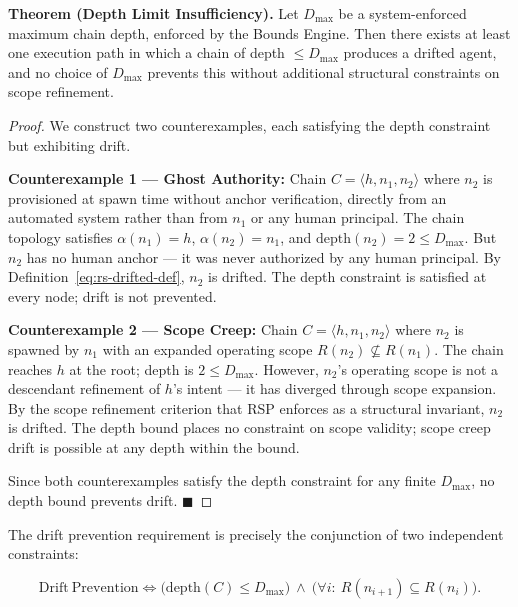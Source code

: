 \begin{samepage}
\medskip
\noindent\textbf{Theorem (Depth Limit Insufficiency).}
Let $D_{\max}$ be a system-enforced maximum chain depth, enforced by the Bounds Engine. Then there exists at least one execution path in which a chain of depth $\leq D_{\max}$ produces a drifted agent, and no choice of $D_{\max}$ prevents this without additional structural constraints on scope refinement.

\begin{proof}
We construct two counterexamples, each satisfying the depth constraint but exhibiting drift.

\medskip
\noindent\textbf{Counterexample 1 — Ghost Authority:} Chain $C = \langle h, n_1, n_2 \rangle$ where $n_2$ is provisioned at spawn time without anchor verification, directly from an automated system rather than from $n_1$ or any human principal. The chain topology satisfies $\alpha(n_1) = h$, $\alpha(n_2) = n_1$, and $\mathrm{depth}(n_2) = 2 \leq D_{\max}$. But $n_2$ has no human anchor — it was never authorized by any human principal. By Definition~\ref{eq:rs-drifted-def}, $n_2$ is drifted. The depth constraint is satisfied at every node; drift is not prevented.

\medskip
\noindent\textbf{Counterexample 2 — Scope Creep:} Chain $C = \langle h, n_1, n_2 \rangle$ where $n_2$ is spawned by $n_1$ with an expanded operating scope $R(n_2) \not\subseteq R(n_1)$. The chain reaches $h$ at the root; depth is $2 \leq D_{\max}$. However, $n_2$'s operating scope is not a descendant refinement of $h$'s intent — it has diverged through scope expansion. By the scope refinement criterion that RSP enforces as a structural invariant, $n_2$ is drifted. The depth bound places no constraint on scope validity; scope creep drift is possible at any depth within the bound.

Since both counterexamples satisfy the depth constraint for any finite $D_{\max}$, no depth bound prevents drift. $\blacksquare$
\end{proof}
\end{samepage}

The drift prevention requirement is precisely the conjunction of two independent constraints:

\begin{equation}
\mathrm{Drift\ Prevention} \iff \bigl( \mathrm{depth}(C) \leq D_{\max} \bigr)\ \land\ \bigl( \forall i:\ R(n_{i+1}) \subseteq R(n_i) \bigr).
\label{eq:rs-drift-prevention-constraint}
\end{equation}

